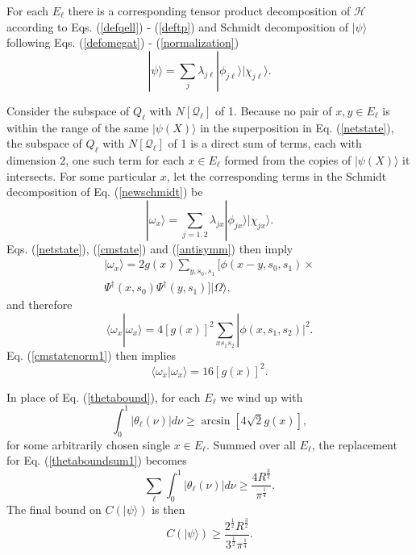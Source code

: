 \documentclass[twocolumn,amsmath,amssymb]{revtex4-1}
\begin{document}
For each $E_\ell$ there is a corresponding tensor product decomposition of $\mathcal{H}$
according to Eqs. (\ref{defqell}) - (\ref{deftp}) 
and Schmidt decomposition 
of $|\psi \rangle $ following Eqs. (\ref{defomegat}) - (\ref{normalization})
\begin{equation}
\label{newschmidt}
|\psi \rangle  = \sum_j \lambda_{j\ell} |\phi_{j\ell} \rangle |\chi_{j\ell} \rangle .
\end{equation}

Consider the subspace of $Q_\ell$ with $N[\mathcal{Q}_\ell]$ of 1. Because no pair
of $x, y \in E_\ell$ is within the range of the same $|\psi(X) \rangle $
in the superposition in Eq. (\ref{netstate}),
the subspace
of $Q_\ell$ with $N[\mathcal{Q}_\ell]$ of 1 is a direct sum of terms, each with
dimension 2, one such term
for each $x \in E_\ell$ formed from the copies of $|\psi(X) \rangle $ it intersects.
For some particular $x$, let the corresponding terms in the Schmidt decomposition
of Eq. (\ref{newschmidt}) be
\begin{equation}
\label{schmidtx}
|\omega_x \rangle  = \sum_{j = 1, 2} \lambda_{jx} |\phi_{jx} \rangle  |\chi_{jx} \rangle .
\end{equation}
Eqs. (\ref{netstate}), (\ref{cmstate}) and (\ref{antisymm}) then imply
\begin{multline}
\label{cmstate1}
|\omega_x \rangle  = 2 g(x) \sum_{y, s_0, s_1} [\phi(x -y, s_0, s_1) \times \\
\Psi^{\dagger}(x,s_0)\Psi^{\dagger}(y,s_1) ]  |\Omega \rangle ,
\end{multline}
and therefore
\begin{equation}
\label{omeganorm0}
 \langle \omega_x | \omega_x \rangle  = 4 [g(x)]^2 \sum_{x s_1 s_2} |\phi(x, s_1, s_2)|^2.
\end{equation}
Eq. (\ref{cmstatenorm1}) then implies
\begin{equation}
\label{omeganorm}
 \langle \omega_x | \omega_x \rangle  = 16 [g(x)]^2.
\end{equation}

In place of Eq. (\ref{thetabound}), for each $E_\ell$ we wind up with
\begin{equation}
\label{thetaboundnew}
\int_0^1 | \theta_{\ell}(\nu)| d \nu
\ge \arcsin[4\sqrt{2} g( x)],
\end{equation}
for some arbitrarily chosen single $x \in E_\ell$.
Summed over all $E_\ell$, the replacement for
Eq. (\ref{thetaboundsum1}) becomes 
\begin{equation}
\label{thetaboundsumnew}
\sum_{\ell}\int_0^1 | \theta_{\ell}(\nu)| d \nu  
\ge \frac{4R^\frac{3}{2}} {\pi^\frac{1}{4}}.
\end{equation} 
The final bound on $C(|\psi \rangle )$ is then
\begin{equation}
\label{finalboundnew}
C( |\psi \rangle ) \ge \frac{2^\frac{1}{2}R^\frac{3}{2}}{ 3^\frac{1}{2} \pi^\frac{1}{4}}.
\end{equation}
\end{document}
